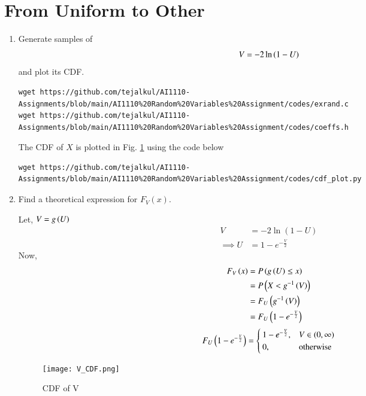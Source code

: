\documentclass[journal,12pt,twocolumn]{IEEEtran}
\renewcommand\thesection{\arabic{section}}
\begin{document}
\section{From Uniform to Other}
\begin{enumerate}[label=\thesection.\arabic*
,ref=\thesection.\theenumi]
%
\item
Generate samples of 
%
\begin{equation}
V = -2\ln\left(1-U\right)
\end{equation}
%
and plot its CDF. 

\solution
\begin{lstlisting}
wget https://github.com/tejalkul/AI1110-Assignments/blob/main/AI1110%20Random%20Variables%20Assignment/codes/exrand.c
wget https://github.com/tejalkul/AI1110-Assignments/blob/main/AI1110%20Random%20Variables%20Assignment/codes/coeffs.h
\end{lstlisting}
The CDF of $X$ is plotted in Fig. \ref{Fig:log_cdf} using the code below
\begin{lstlisting}
wget https://github.com/tejalkul/AI1110-Assignments/blob/main/AI1110%20Random%20Variables%20Assignment/codes/cdf_plot.py
\end{lstlisting}
 
 \item Find a theoretical expression for $F_V(x)$.

\solution
Let, $V = g\left(U\right)$
\begin{align}
    V &= -2\ln{(1 - U)} \\
    \implies U &= 1 - e^{-\frac{V}{2}}
\end{align}
Now, 
\begin{align}
    F_{V}\left(x\right) &= P\left(g\left(U\right)\leq x\right) \\
                  &= P\left(X < g^{-1}\left(V\right)\right) \\
                  &= F_{U}\left(g^{-1}\left(V\right)\right) \\
                  &= F_{U}\left(1 - e^{-\frac{V}{2}}\right)
\end{align}
\begin{align}  
F_{U}\left(1 - e^{-\frac{V}{2}}\right) = 
\begin{cases}
1 - e^{-\frac{V}{2}}, & V \in (0,\infty) \\
0, & \text{otherwise}
\end{cases}
\end{align}
\begin{figure}[!ht]
\texttt{[image: V\_CDF.png]}
\caption{CDF of V}
\label{Fig:log_cdf}
\end{figure}  
%
\end{enumerate}
\end{document}
